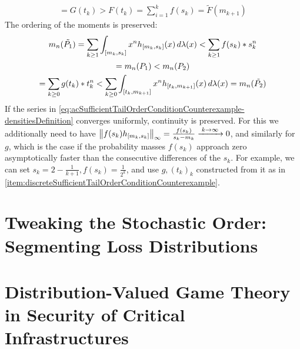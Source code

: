 \documentclass[a4paper]{scrreprt}
\begin{document}
\begin{ex}
\begin{enumerate}
\begin{gather*}
                = G(t_k)
                > F(t_k)
                = \sum_{i=1}^{k} f(s_k) 
                = \tilde{F}(m_{k+1})
            \end{gather*}
            The ordering of the moments is preserved:
            \begin{multline*}
                m_n(\tilde{P_1})
                = \sum_{k \geq 1} \int_{[m_k, s_k]} x^n h_{[m_k, s_k]}(x) \, d\lambda(x)
                < \sum_{k \geq 1} f(s_k)*s_k^n \\
                = m_n(P_1)
                < m_n(P_2) \\
                = \sum_{k \geq 0} g(t_k)*t_k^n
                < \sum_{k \geq 0} \int_{[t_k, m_{k+1}]} x^n h_{[t_k, m_{k+1}]}(x) \, d\lambda(x)
                = m_n(\tilde{P_2})
            \end{multline*}
            If the series in \eqref{eq:acSufficientTailOrderConditionCounterexample-densitiesDefinition} converges uniformly, continuity is preserved.
            For this we additionally need to have $\left\lVert f(s_k) h_{[m_k, s_k]}\right\rVert_\infty = \frac{f(s_k)}{s_k - m_k} \xrightarrow{\;k \to \infty\;} 0$, and similarly for $g$, which is the case if the probability masses $f(s_k)$ approach zero asymptotically faster than the consecutive differences of the $s_k$. For example, we can set $s_k = 2-\frac{1}{k+1}, f(s_k) = \frac{1}{2^k}$, and use $g, (t_k)_k$ constructed from it as in \ref{item:discreteSufficientTailOrderConditionCounterexample}.
        \end{enumerate}
    \end{ex}
    
    
    \chapter{Tweaking the Stochastic Order: Segmenting Loss Distributions}
    
    
    \chapter{Distribution-Valued Game Theory in Security of Critical Infrastructures}
    
\end{document}

